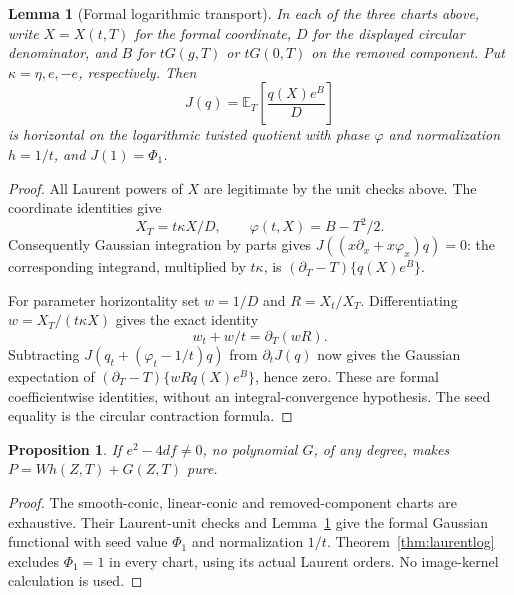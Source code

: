 \documentclass[11pt]{article}
\newtheorem{proposition}[theorem]{Proposition}
\newtheorem{lemma}[theorem]{Lemma}
\theoremstyle{definition}\newtheorem{definition}[theorem]{Definition}
\theoremstyle{remark}\newtheorem{remark}[theorem]{Remark}
\newcommand{\E}{\mathbb E}
\begin{document}
\begin{lemma}[Formal logarithmic transport]\label{lem:logtransport}
In each of the three charts above, write $X=X(t,T)$ for the formal
coordinate, $D$ for the displayed circular denominator, and $B$ for
$tG(g,T)$ or $tG(0,T)$ on the removed component. Put
$\kappa=\eta,e,-e$, respectively. Then
\[
 J(q)=\E_T\!\left[\frac{q(X)e^B}{D}\right]
\]
is horizontal on the logarithmic twisted quotient with phase
$\varphi$ and normalization $h=1/t$, and $J(1)=\Phi_1$.
\end{lemma}
\begin{proof}
All Laurent powers of $X$ are legitimate by the unit checks above.
The coordinate identities give
\[
 X_T=t\kappa X/D,\qquad
 \varphi(t,X)=B-T^2/2.
\]
Consequently Gaussian integration by parts gives
$J((x\partial_x+x\varphi_x)q)=0$: the corresponding integrand,
multiplied by $t\kappa$, is
$(\partial_T-T)\{q(X)e^B\}$.

For parameter horizontality set $w=1/D$ and $R=X_t/X_T$.
Differentiating $w=X_T/(t\kappa X)$ gives the exact identity
\[
 w_t+w/t=\partial_T(wR).
\]
Subtracting $J(q_t+(\varphi_t-1/t)q)$ from $\partial_tJ(q)$ now
gives the Gaussian expectation of
$(\partial_T-T)\{wR q(X)e^B\}$, hence zero. These are formal
coefficientwise identities, without an integral-convergence hypothesis.
The seed equality is the circular contraction formula.
\end{proof}

\begin{proposition}\label{prop:nondeglog}
If $e^2-4df\ne0$, no polynomial $G$, of any degree, makes
$P=Wh(Z,T)+G(Z,T)$ pure.
\end{proposition}
\begin{proof}
The smooth-conic, linear-conic and removed-component charts are
exhaustive. Their Laurent-unit checks and
Lemma~\ref{lem:logtransport} give the formal Gaussian functional
with seed value $\Phi_1$ and normalization $1/t$.
Theorem~\ref{thm:laurentlog} excludes $\Phi_1=1$ in every chart,
using its actual Laurent orders. No image-kernel calculation is used.
\end{proof}
\end{document}
